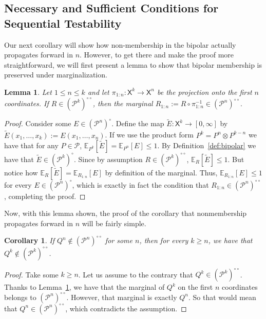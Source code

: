 \documentclass[11pt]{article}
\newcommand{\E}{\mathbb{E}}
\newcommand{\Pcal}{\mathcal{P}}
\newcommand{\X}{\mathsf{X}}
\newcommand{\bPn}{(\mathcal{P}^n)^{\circ\circ}}
\newcommand{\bPk}{(\mathcal{P}^k)^{\circ\circ}}
\newtheorem{lemma}[theorem]{Lemma}
\newtheorem{corollary}[theorem]{Corollary}
\theoremstyle{definition}
\theoremstyle{definition}
\begin{document}
\subsection{Necessary and Sufficient Conditions for Sequential Testability}

Our next corollary will show how non-membership in the bipolar actually propagates forward in $n$. However, to get there and make the proof more straightforward, we will first present a lemma to show that bipolar membership is preserved under marginalization.

\begin{lemma}\label{lem:bipolar-marginal}
Let $1\le n\le k$ and let $\pi_{1:n}:\X^k\to \X^n$ be the projection onto the first $n$ coordinates. If $R\in(\Pcal^k)^{\circ\circ}$, then the marginal
\(
R_{1:n}:=R\circ \pi_{1:n}^{-1}\in(\Pcal^n)^{\circ\circ}.
\)
\end{lemma}

\begin{proof}
Consider some $E\in(\Pcal^n)^\circ$. Define the map $\widetilde E:\X^k\to[0,\infty]$ by $\widetilde E(x_1,\dots,x_k):=E(x_1,\dots,x_n)$. If we use the product form $P^k=P^n\otimes P^{k-n}$ we have that for any $P\in\Pcal$, $\E_{P^k}[\widetilde E]=\E_{P^n}[E]\le 1$. By Definition~\ref{def:bipolar} we have that $\widetilde E\in(\Pcal^k)^\circ$. Since by assumption $R\in(\Pcal^k)^{\circ\circ}$, $\E_R[\widetilde E]\le 1$. But notice how $\E_R[\widetilde E]=\E_{R_{1:n}}[E]$ by definition of the marginal. Thus, $\E_{R_{1:n}}[E]\le 1$ for every $E\in(\Pcal^n)^\circ$, which is exactly in fact the condition that $R_{1:n}\in(\Pcal^n)^{\circ\circ}$, completing the proof.     
\end{proof}

Now, with this lemma shown, the proof of the corollary that nonmembership propagates forward in $n$ will be fairly simple.

\begin{corollary}\label{cor:out-propogates}
If $Q^n\not\in\bPn$ for some $n$, then for every $k\ge n$, we have that $Q^k\not\in\bPk$.    
\end{corollary}

\begin{proof}
Take some $k\ge n$. Let us assume to the contrary that $Q^k\in\bPk$. Thanks to Lemma~\ref{lem:bipolar-marginal}, we have that the marginal of $Q^k$ on the first $n$ coordinates belongs to $\bPn$. However, that marginal is exactly $Q^n$. So that would mean that $Q^n\in\bPn$, which contradicts the assumption.    
\end{proof}
\end{document}
